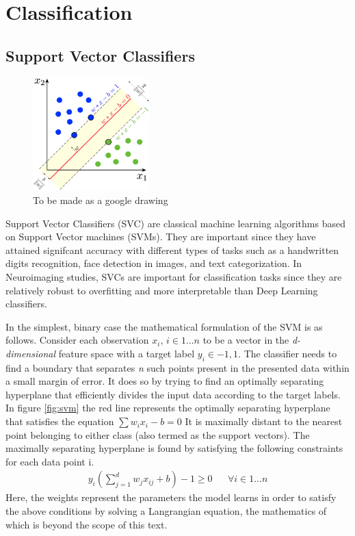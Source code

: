 \documentclass[msthesis.tex]{subfiles}
\begin{document}
\section{Classification}
\subsection{Support Vector Classifiers}
\begin{figure}
    \label{fig:svm}
    \centering
    \includegraphics[width=0.4\textwidth]{images/svm.png}
    \caption{To be made as a google drawing}
    \label{fig:my_label}
\end{figure}

Support Vector Classifiers (SVC) are classical machine learning algorithms based on Support Vector machines (SVMs). They are important since they have attained signifcant accuracy with different types of tasks such as a handwritten digits recognition, face detection in images, and text categorization\cite{burges1998a}. In Neuroimaging studies, SVCs are important for classification tasks since they are relatively robust to overfitting and more interpretable than Deep Learning classifiers.

In the simplest, binary case the mathematical formulation of the SVM is as follows. Consider each observation \textbf{$x_i$}, $i\in {1...n}$ to be a vector in the \textit{d-dimensional} feature space with a target label  $y_i\in {-1,1}$. The classifier needs to find a boundary that separates \textit{n} such points present in the presented data within a small margin of error.  It does so by trying to find an optimally separating hyperplane that efficiently divides the input data according to the target labels. In figure \ref{fig:svm} the red line represents the optimally separating hyperplane that satisfies the equation
$ \sum w_i x_i - b = 0$
 It is maximally distant to the nearest point belonging to either class (also termed as the support vectors). The maximally separating hyperplane is found by satisfying the following constraints for each data point i. 
\begin{align}
    y_i(\sum_{j=1}^{d} w_{j} x_{ij}  + b)  - 1\geq 0 && \forall i \in {1...n}
\end{align}
Here, the weights represent the parameters the model learns in order to satisfy the above conditions by solving a Langrangian equation, the mathematics of which is beyond the scope of this text.  
\end{document}
